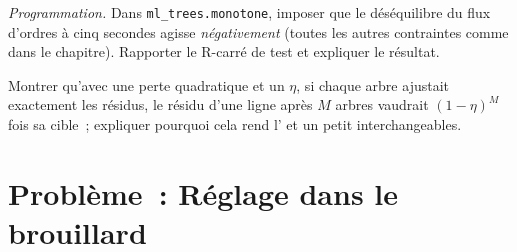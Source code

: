 \begin{exercise}[$\star\star\star$]\label{exo:ml:trees-and-boosting:7}
\emph{Programmation.} Dans \texttt{ml\_trees.monotone}, imposer que le déséquilibre du flux d'ordres à cinq secondes agisse \emph{négativement}
(toutes les autres contraintes comme dans le chapitre). Rapporter le R-carré de test et expliquer le résultat.
\end{exercise}

\begin{exercise}[$\star\star\star$]\label{exo:ml:trees-and-boosting:8}
Montrer qu'avec une perte quadratique et un  $\eta$, si chaque arbre ajustait exactement les résidus, le résidu
d'une ligne après $M$ arbres vaudrait $(1 - \eta)^M$ fois sa cible~; expliquer pourquoi cela rend l' et un petit  interchangeables.
\end{exercise}

\section{Problème~: Réglage dans le brouillard}

